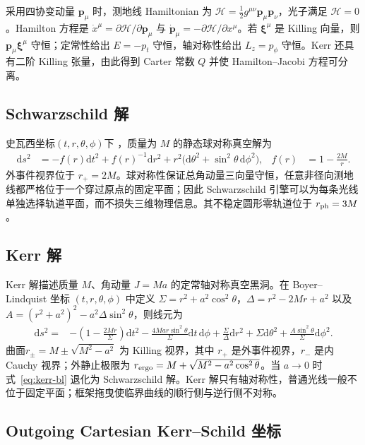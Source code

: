 \documentclass[UTF8,11pt,a4paper,fontset=fandol]{ctexart}
\newcommand{\dd}{\mathrm{d}}
\newcommand{\Ham}{\mathcal H}
\begin{document}
采用四协变动量 \(\bm{p}_\mu\) 时，测地线 Hamiltonian 为 \(\Ham=\tfrac12g^{\mu\nu}\bm{p}_\mu\bm{p}_\nu\)，光子满足 \(\Ham=0\)。Hamilton 方程是 \(\dot x^\mu=\partial\Ham/\partial\bm{p}_\mu\) 与 \(\dot{\bm{p}}_\mu=-\partial\Ham/\partial x^\mu\)。若 \(\bm{\xi}^\mu\) 是 Killing 向量，则 \(\bm{p}_\mu\bm{\xi}^\mu\) 守恒；定常性给出 \(E=-p_t\) 守恒，轴对称性给出 \(L_z=p_\phi\) 守恒。Kerr 还具有二阶 Killing 张量，由此得到 Carter 常数 \(Q\) 并使 Hamilton--Jacobi 方程可分离\cite{Carter1968a,Carter1968b}。

\subsection{Schwarzschild 解}

史瓦西坐标\((t,r,\theta,\phi)\)下 ，质量为 \(M\) 的静态球对称真空解为
\begin{align}
 \dd s^2&=-f(r)\dd t^2+f(r)^{-1}\dd r^2
 +r^2\bigl(\dd\theta^2+\sin^2\theta\,\dd\phi^2\bigr),
 &f(r)&=1-\frac{2M}{r}. \label{eq:schwarzschild-metric}
\end{align}
外事件视界位于 \(r_+=2M\)。球对称性保证总角动量三向量守恒，任意非径向测地线都严格位于一个穿过原点的固定平面；因此 Schwarzschild 引擎可以为每条光线单独选择轨道平面，而不损失三维物理信息。其不稳定圆形零轨道位于 \(r_{\rm ph}=3M\)。

\subsection{Kerr 解}

Kerr 解描述质量 \(M\)、角动量 \(J=Ma\) 的定常轴对称真空黑洞\cite{Kerr1963}。在 Boyer--Lindquist 坐标 \((t,r,\theta,\phi)\) 中定义 \(\Sigma=r^2+a^2\cos^2\theta\)，\(\Delta=r^2-2Mr+a^2\) 以及 \(A=(r^2+a^2)^2-a^2\Delta\sin^2\theta\)，则线元为
\begin{align}
 \dd s^2={}&-\left(1-\frac{2Mr}{\Sigma}\right)\dd t^2
 -\frac{4Mar\sin^2\theta}{\Sigma}\dd t\,\dd\phi
 +\frac{\Sigma}{\Delta}\dd r^2+\Sigma\dd\theta^2
 +\frac{A\sin^2\theta}{\Sigma}\dd\phi^2. \label{eq:kerr-bl}
\end{align}
曲面\(r_\pm=M\pm\sqrt{M^2-a^2}\) 为 Killing 视界，其中 \(r_+\) 是外事件视界，\(r_-\) 是内 Cauchy 视界；外静止极限为 \(r_{\rm ergo}=M+\sqrt{M^2-a^2\cos^2\theta}\)。当 \(a\to0\) 时式~\eqref{eq:kerr-bl} 退化为 Schwarzschild 解。Kerr 解只有轴对称性，普通光线一般不位于固定平面；框架拖曳使临界曲线的顺行侧与逆行侧不对称。


\subsection{Outgoing Cartesian Kerr--Schild 坐标}
\end{document}
